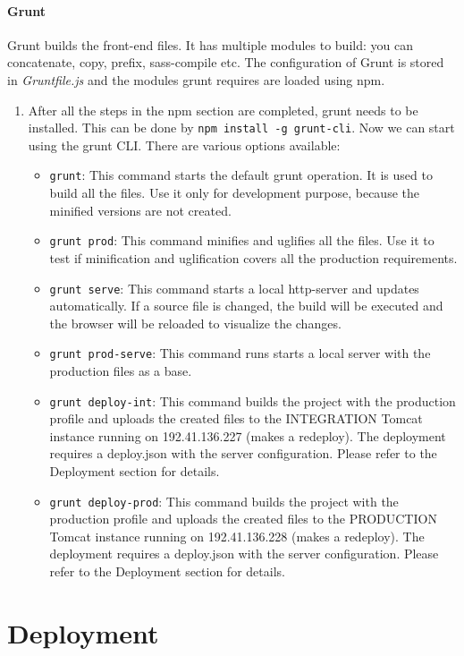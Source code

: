\paragraph{Grunt}
Grunt builds the front-end files. It has multiple modules to build: you can concatenate, copy, prefix, sass-compile etc. The configuration of Grunt is stored in \textit{Gruntfile.js} and the modules grunt requires are loaded using npm.
\begin{enumerate}
  \item After all the steps in the npm section are completed, grunt needs to be installed. This can be done by \texttt{npm install -g grunt-cli}. Now we can start using the grunt CLI. There are various options available:
  \begin{itemize}
	\item \texttt{grunt}: This command starts the default grunt operation. It is used to build all the files. Use it only for development purpose, because the minified versions are not created.
	\item \texttt{grunt prod}: This command minifies and uglifies all the files. Use it to test if minification and uglification covers all the production requirements.
	\item \texttt{grunt serve}: This command starts a local http-server and updates automatically. If a source file is changed, the build will be executed and the browser will be reloaded to visualize the changes.
	\item \texttt{grunt prod-serve}: This command runs starts a local server with the production files as a base.
	\item \texttt{grunt deploy-int}: This command builds the project with the production profile and uploads the created files to the INTEGRATION Tomcat instance running on 192.41.136.227 (makes a redeploy). The deployment requires a deploy.json with the server configuration. Please refer to the Deployment section for details.
	\item \texttt{grunt deploy-prod}: This command builds the project with the production profile and uploads the created files to the PRODUCTION Tomcat instance running on 192.41.136.228 (makes a redeploy). The deployment requires a deploy.json with the server configuration. Please refer to the Deployment section for details.
    \end{itemize}
\end{enumerate}

\section{Deployment}

